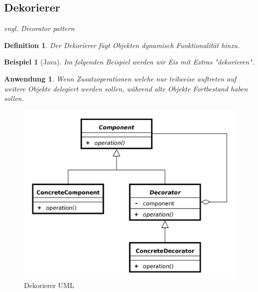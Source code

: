 \documentclass[a4paper]{article}
\theoremstyle{break}
\newtheorem{defi}{Definition}[section]
\newtheorem{ex}{Beispiel}[section]
\newtheorem{why}{Anwendung}[section]
\begin{document}
\newpage
\subsection{Dekorierer}

\textit{engl. Decorator pattern}

\begin{defi}
	Der Dekorierer fügt Objekten dynamisch Funktionalität hinzu.
\end{defi}

\begin{ex}[Java]
	Im folgenden Beispiel werden wir Eis mit Extras "dekorieren".
	
	
	
	
	
	
	
	
	
\end{ex}

\begin{why}
	Wenn Zusatzoperationen welche nur teilweise auftreten auf weitere Objekte delegiert werden sollen, während alte Objekte Fortbestand haben sollen.
\end{why}
\begin{figure}[H]
	\centering
	\includegraphics[width=\textwidth]{../uml/DecoratorPattern.png}
	\caption{Dekorierer UML}
	\label{fig3}
\end{figure}
\end{document}
